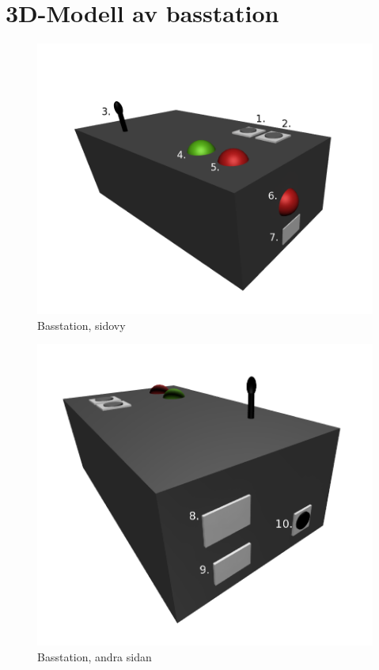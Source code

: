 \documentclass[a4paper,11pt]{article}
\begin{document}
\pagebreak

\section{3D-Modell av basstation}

\begin{figure}[H]
\begin{center}
\includegraphics[scale=0.3, angle=0]{drawing_base.png}
\end{center}
\label{fig:drawing_base}
\caption{Basstation, sidovy}
\end{figure}

\begin{figure}[H]
\begin{center}
\includegraphics[scale=0.3, angle=0]{drawing_base_side.png}
\end{center}
\label{fig:drawing_base_side}
\caption{Basstation, andra sidan}
\end{figure}
\end{document}
